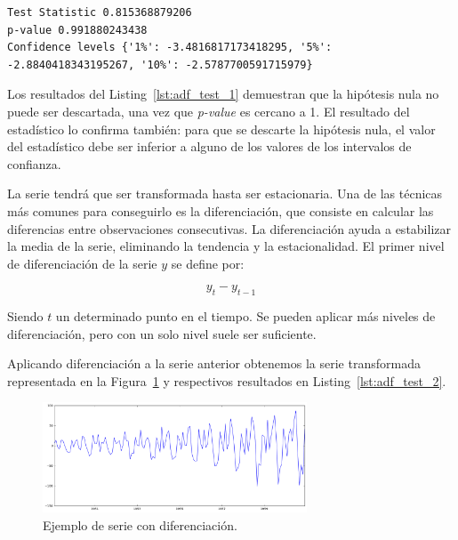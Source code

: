 \documentclass[11pt,spanish,listoffigures,listoftables]{tfgetsinf}
\begin{document}
    \lstset{style=python}
    \begin{lstlisting}[caption=Resultados del test de Dickey-Fuller de {\tt statsmodels} de Python., label={lst:adf_res_1}]
Test Statistic 0.815368879206
p-value 0.991880243438
Confidence levels {'1%': -3.4816817173418295, '5%': -2.8840418343195267, '10%': -2.5787700591715979}
    \end{lstlisting}
    
    Los resultados del Listing~\ref{lst:adf_test_1} demuestran que la hipótesis nula no puede ser descartada, una vez que {\em p-value} es cercano a 1. El resultado del estadístico lo confirma también: para que se descarte la hipótesis nula, el valor del estadístico debe ser inferior a alguno de los valores de los intervalos de confianza.
    
    La serie tendrá que ser transformada hasta ser estacionaria. Una de las técnicas más comunes para conseguirlo es la diferenciación, que consiste en calcular las diferencias entre observaciones consecutivas. La diferenciación ayuda a estabilizar la media de la serie, eliminando la tendencia y la estacionalidad. El primer nivel de diferenciación de la serie \(y\) se define por:
    
    \begin{equation}
    y_{t}-y_{t-1}
    \end{equation}
    
    Siendo \(t\) un determinado punto en el tiempo. Se pueden aplicar más niveles de diferenciación, pero con un solo nivel suele ser suficiente.
    
    Aplicando diferenciación a la serie anterior obtenemos la serie transformada representada en la Figura~\ref{fig:ts_diff} y respectivos resultados en Listing~\ref{lst:adf_test_2}.
    
    \begin{figure}[h]
        \centering
        \includegraphics[width=0.7\textwidth]{ts_diff.png}
        \caption{Ejemplo de serie con diferenciación.}
        \label{fig:ts_diff}
    \end{figure}
    
\end{document}
